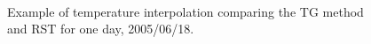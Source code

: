 \documentclass[reviewcopy]{elsart}
\begin{document}
\begin{figure}[htbp]
  \centering
  \mbox{
    \quad
  }
   \caption{
%
     Example of temperature interpolation
     comparing the \ac{TG} method and \ac{RST} 
     for one day, 2005/06/18.
%
   }
  \label{fig:T}
\end{figure}

\end{document}
